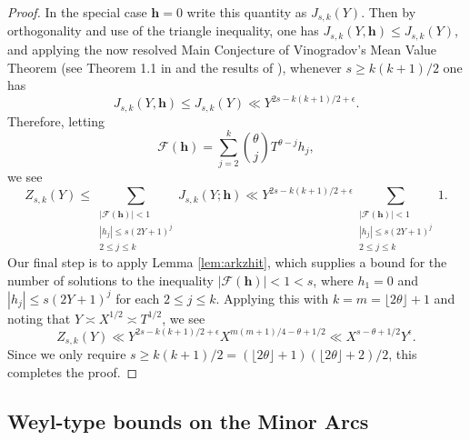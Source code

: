 \documentclass[11pt,reqno]{amsart}
\numberwithin{equation}{section}
\begin{document}
\begin{proof}
In the special case $\mathbf{h} = 0$ write this quantity as $J_{s,k}(Y)$. Then by orthogonality and use of the triangle inequality, one has $J_{s,k}(Y, \mathbf{h}) \leq J_{s,k}(Y)$, and applying the now resolved Main Conjecture of Vinogradov's Mean Value Theorem (see Theorem 1.1 in \cite{BDG} and the results of \cite{WooNEC}), whenever $s \geq k(k+1)/2$ one has 
\[ J_{s,k}(Y, \mathbf{h}) \leq J_{s,k}(Y) \ll Y^{2s-k(k+1)/2+\epsilon}. \]
Therefore, letting 
\[ \mathcal{F}(\mathbf{h}) = \sum_{j=2}^k \binom{\theta}{j} T^{\theta-j}h_j, \] 
we see 
\[ Z_{s,k}(Y) \leq \sum_{\substack{|\mathcal{F}(\mathbf{h})| < 1 \\ |h_j| \leq s(2Y+1)^{j} \\ 2 \leq j \leq k}} J_{s,k}(Y; \mathbf{h}) \ll Y^{2s-k(k+1)/2+\epsilon} \sum_{\substack{|\mathcal{F}(\mathbf{h})| < 1 \\ |h_j| \leq s(2Y+1)^{j} \\ 2 \leq j \leq k}} 1. \]
Our final step is to apply Lemma \ref{lem:arkzhit}, which supplies a bound for the number of solutions to the inequality $|\mathcal{F}(\mathbf{h})| < 1<s$, where $h_1 = 0$ and $|h_j| \leq s(2Y+1)^j$ for each $2 \leq j \leq k$. Applying this with $k = m = \lfloor 2\theta \rfloor + 1$ and noting that $Y \asymp X^{1/2} \asymp T^{1/2}$, we see 
\[ Z_{s,k}(Y) \ll Y^{2s-k(k+1)/2+\epsilon}X^{m(m+1)/4-\theta+1/2} \ll X^{s-\theta+1/2}Y^{\epsilon}. \]
Since we only require $s \geq k(k+1)/2 = (\lfloor 2\theta \rfloor + 1)(\lfloor 2\theta \rfloor + 2)/2$, this completes the proof. 
\end{proof}



\subsection{Weyl-type bounds on the Minor Arcs} 
\end{document}
